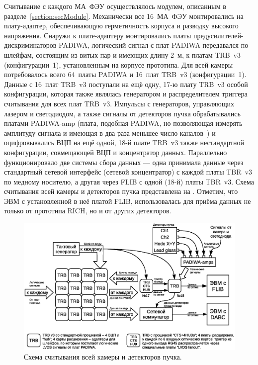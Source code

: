 Считывание с каждого МА~ФЭУ осуществлялось модулем, описанным в разделе~\ref{section:secModule}. Механически все 16~МА~ФЭУ монтировались на плату-адаптер, обеспечивающую герметичность корпуса и разводку высокого напряжения. Снаружи к плате-адаптеру монтировались платы предусилителей-дискриминаторов PADIWA, логический сигнал с плат PADIWA передавался по шлейфам, состоящим из витых пар и имеющих длину 2~м, к платам TRB~v3 (конфигурации~1), установленным на корпусе прототипа. Для всей камеры потребовалось всего 64~платы PADIWA и 16~плат TRB~v3 (конфигурации~1). Данные с 16~плат TRB~v3 поступали на ещё одну, 17-ю плату TRB~v3 особой конфигурации, которая также являлась генератором и распределителем триггера считывания для всех плат TRB~v3. Импульсы с генераторов, управляющих лазером и светодиодом, а также сигналы от детекторов пучка обрабатывались платами PADIWA-amp (плата, подобная PADIWA, но позволяющая измерять амплитуду сигнала и имеющая в два раза меньшее число каналов~\cite{TRBSITE}) и оцифровывались ВЦП на ещё одной, 18-й плате TRB~v3 также нестандартной конфигурации, совмещающей ВЦП и концентратор данных. Параллельно функционировало две системы сбора данных --- одна принимала данные через стандартный сетевой интерфейс (сетевой концентратор) с каждой платы TBR~v3 по медному носителю, а другая через FLIB с одной (18-й) платы TBR~v3. Схема считывания всей камеры и детекторов пучка представлена на . Отметим, что ЭВМ с установленной в неё платой FLIB, использовалась для приёма данных не только от прототипа RICH, но и от других детекторов.

\begin{figure}[H]
\includegraphics[width=1.0\textwidth]{pictures/11_Beamtime_readout_chain.eps}
\caption{Схема считывания всей камеры и детекторов пучка.}
\label{fig:BeamtimeReadout}
\end{figure}

